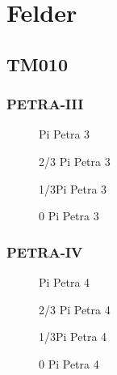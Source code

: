 \chapter{Felder}
\label{sec:appendix_felder}

\section{TM010}
\label{app:tm010_felder}

\subsection{PETRA-III}
\FloatBarrier
\begin{figure}[h]
  \centering
  
  \caption{Pi Petra 3}
\end{figure}

\begin{figure}[h]
  \centering
  
  \caption{2/3 Pi Petra 3}
\end{figure}

\begin{figure}[h]
  \centering
  
  \caption{1/3Pi Petra 3}
\end{figure}

\begin{figure}[h]
  \centering
  
  \caption{0 Pi Petra 3}
\end{figure}
\FloatBarrier

\subsection{PETRA-IV}
\FloatBarrier
\begin{figure}[h]
  \centering
  
  \caption{Pi Petra 4}
\end{figure}

\begin{figure}[h]
  \centering
  
  \caption{2/3 Pi Petra 4}
\end{figure}

\begin{figure}[h]
  \centering
  
  \caption{1/3Pi Petra 4}
\end{figure}

\begin{figure}[h]
  \centering
  
  \caption{0 Pi Petra 4}
\end{figure}
\FloatBarrier
